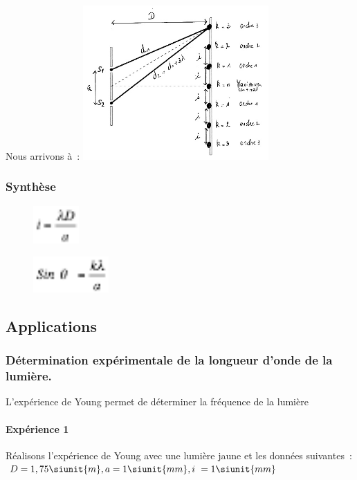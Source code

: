 Nous arrivons à~:
\includegraphics[width=7.086cm,height=5.897cm]{Pictures/100000010000020C000001B4676C159EC881E6E3.png}

\subsubsection{Synthèse}

\begin{figure}
\centering
\includegraphics[width=1.757cm,height=1.432cm]{Pictures/100000010000001A000000159D382765312EA964.png}
\caption{}
\end{figure}

\begin{figure}
\centering
\includegraphics[width=2.894cm,height=1.389cm]{Pictures/100000010000002C0000001558E0CCA95D4F59EB.png}
\caption{}
\end{figure}

\subsection{Applications}

\subsubsection{Détermination expérimentale de la longueur d'onde de la lumière. }

L'expérience de Young permet de déterminer la fréquence de la lumière
\paragraph{Expérience 1}
Réalisons l'expérience de Young avec une lumière jaune et les données
suivantes~: $D=1,75 \siunit{m}, a=1 \siunit{mm}, i~=1 \siunit{mm}$

